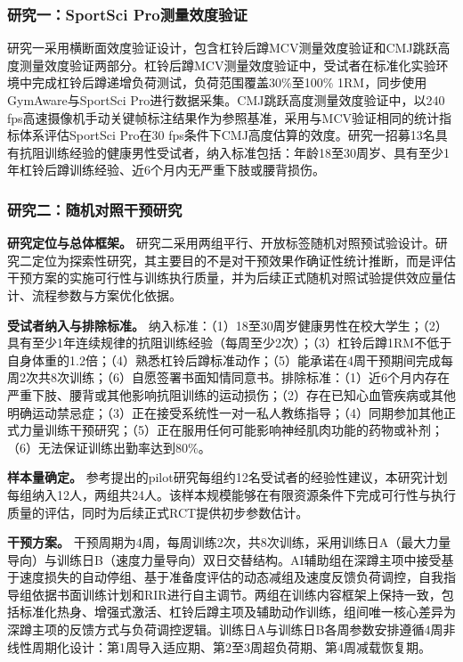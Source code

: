 \subsubsection{研究一：SportSci Pro测量效度验证}

研究一采用横断面效度验证设计，包含杠铃后蹲MCV测量效度验证和CMJ跳跃高度测量效度验证两部分。杠铃后蹲MCV测量效度验证中，受试者在标准化实验环境中完成杠铃后蹲递增负荷测试，负荷范围覆盖30\%至100\% 1RM，同步使用GymAware与SportSci Pro进行数据采集。CMJ跳跃高度测量效度验证中，以240 fps高速摄像机手动关键帧标注结果作为参照基准，采用与MCV验证相同的统计指标体系评估SportSci Pro在30 fps条件下CMJ高度估算的效度。研究一招募13名具有抗阻训练经验的健康男性受试者，纳入标准包括：年龄18至30周岁、具有至少1年杠铃后蹲训练经验、近6个月内无严重下肢或腰背损伤。

\subsubsection{研究二：随机对照干预研究}

\textbf{研究定位与总体框架。} 研究二采用两组平行、开放标签随机对照预试验设计。研究二定位为探索性研究，其主要目的不是对干预效果作确证性统计推断，而是评估干预方案的实施可行性与训练执行质量，并为后续正式随机对照试验提供效应量估计、流程参数与方案优化依据。

\textbf{受试者纳入与排除标准。} 纳入标准：（1）18至30周岁健康男性在校大学生；（2）具有至少1年连续规律的抗阻训练经验（每周至少2次）；（3）杠铃后蹲1RM不低于自身体重的1.2倍；（4）熟悉杠铃后蹲标准动作；（5）能承诺在4周干预期间完成每周2次共8次训练；（6）自愿签署书面知情同意书。排除标准：（1）近6个月内存在严重下肢、腰背或其他影响抗阻训练的运动损伤；（2）存在已知心血管疾病或其他明确运动禁忌症；（3）正在接受系统性一对一私人教练指导；（4）同期参加其他正式力量训练干预研究；（5）正在服用任何可能影响神经肌肉功能的药物或补剂；（6）无法保证训练出勤率达到80\%。

\textbf{样本量确定。} 参考\citep{Julious2005}提出的pilot研究每组约12名受试者的经验性建议，本研究计划每组纳入12人，两组共24人。该样本规模能够在有限资源条件下完成可行性与执行质量的评估，同时为后续正式RCT提供初步参数估计。

\textbf{干预方案。} 干预周期为4周，每周训练2次，共8次训练，采用训练日A（最大力量导向）与训练日B（速度力量导向）双日交替结构。AI辅助组在深蹲主项中接受基于速度损失的自动停组、基于准备度评估的动态减组及速度反馈负荷调控，自我指导组依据书面训练计划和RIR进行自主调节。两组在训练内容框架上保持一致，包括标准化热身、增强式激活、杠铃后蹲主项及辅助动作训练，组间唯一核心差异为深蹲主项的反馈方式与负荷调控逻辑。训练日A与训练日B各周参数安排遵循4周非线性周期化设计：第1周导入适应期、第2至3周超负荷期、第4周减载恢复期。

